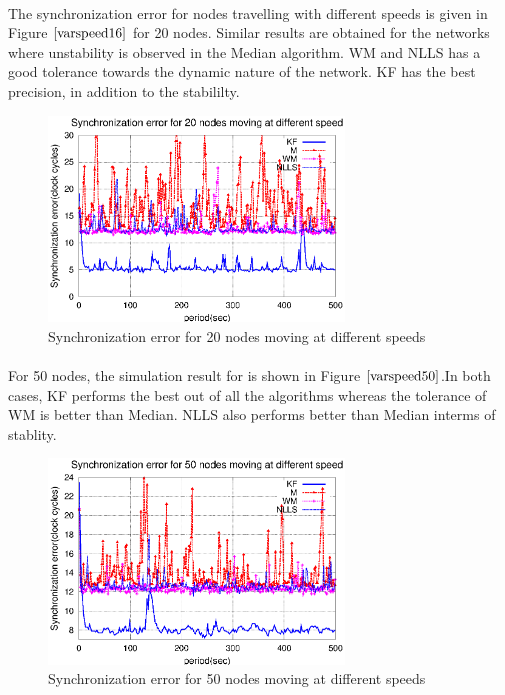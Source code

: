 \documentclass[a4paper,10pt]{report}
\begin{document}
\paragraph*{}
The synchronization error for nodes travelling with different speeds is given in Figure $\ref{varspeed16}$ for 20 nodes. Similar results are obtained for the networks where unstability is observed in the Median algorithm. WM and NLLS has a good tolerance towards the dynamic nature of the network. KF has the best precision, in addition to the stabililty.
\begin{figure}
 \centering
 \includegraphics[width=0.7\textwidth]{varspeed20}
 \caption{Synchronization error for 20 nodes moving at different speeds}
 \label{varspeed16}
\end{figure}
\paragraph*{}
For 50 nodes, the simulation result for is shown in Figure $\ref{varspeed50}$.In both cases, KF performs the best out of all the algorithms whereas the tolerance of WM is better than Median. NLLS also performs better than Median interms of stablity.
\begin{figure}
 \centering
 \includegraphics[width=0.7\textwidth]{varspeed50}
 \caption{Synchronization error for 50 nodes moving at different speeds}
 \label{varspeed50}
\end{figure}
\end{document}
